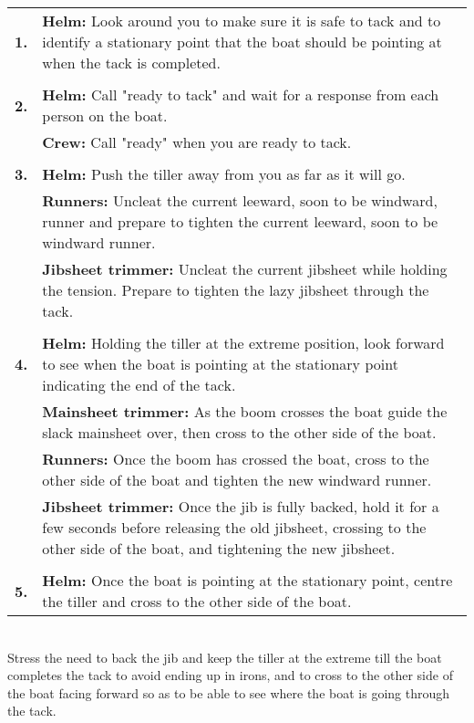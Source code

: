 \documentclass[12pt]{scrartcl}
\begin{document}
\label{tab:tacking drill}
\begin{tabularx}{420pt}{lX}
	\centering
	\textbf{1.} & \textbf{Helm:} Look around you to make sure it is safe to tack and to identify a stationary point that the boat should be pointing at when the tack is completed. \\
	& \\
	\textbf{2.} & \textbf{Helm:} Call "ready to tack" and wait for a response from each person on the boat. \\
	& \textbf{Crew:} Call "ready" when you are ready to tack. \\
	& \\
	\textbf{3.} & \textbf{Helm:} Push the tiller away from you as far as it will go. \\
	& \textbf{Runners:} Uncleat the current leeward, soon to be windward, runner and prepare to tighten the current leeward, soon to be windward runner. \\
	& \textbf{Jibsheet trimmer:} Uncleat the current jibsheet while holding the tension. Prepare to tighten the lazy jibsheet through the tack. \\
	& \\
	\textbf{4.} & \textbf{Helm:} Holding the tiller at the extreme position, look forward to see when the boat is pointing at the stationary point indicating the end of the tack. \\
	& \textbf{Mainsheet trimmer:} As the boom crosses the boat guide the slack mainsheet over, then cross to the other side of the boat. \\
	& \textbf{Runners:} Once the boom has crossed the boat, cross to the other side of the boat and tighten the new windward runner. \\
	& \textbf{Jibsheet trimmer:} Once the jib is fully backed, hold it for a few seconds before releasing the old jibsheet, crossing to the other side of the boat, and tightening the new jibsheet. \\
	& \\
	\textbf{5.} & \textbf{Helm:} Once the boat is pointing at the stationary point, centre the tiller and cross to the other side of the boat. \\
\end{tabularx}
\\

Stress the need to back the jib and keep the tiller at the extreme till the boat completes the tack to avoid ending up in irons, and to cross to the other side of the boat facing forward so as to be able to see where the boat is going through the tack.
\end{document}
